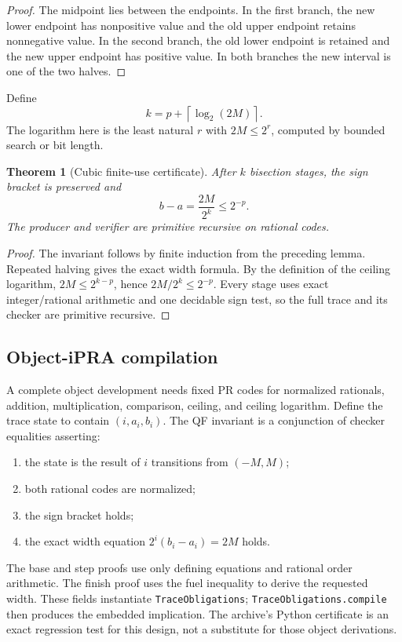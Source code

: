 \documentclass[11pt]{article}
\newtheorem{theorem}{Theorem}[section]
\begin{document}
\begin{proof}
The midpoint lies between the endpoints.  In the first branch, the new lower
endpoint has nonpositive value and the old upper endpoint retains nonnegative
value.  In the second branch, the old lower endpoint is retained and the new
upper endpoint has positive value.  In both branches the new interval is one
of the two halves.
\end{proof}

Define
\[
  k=p+\left\lceil\log_2(2M)\right\rceil.
\]
The logarithm here is the least natural \(r\) with \(2M\le2^r\), computed by
bounded search or bit length.

\begin{theorem}[Cubic finite-use certificate]
\label{thm:cubic}
After \(k\) bisection stages, the sign bracket is preserved and
\[
  b-a=\frac{2M}{2^k}\le2^{-p}.
\]
The producer and verifier are primitive recursive on rational codes.
\end{theorem}

\begin{proof}
The invariant follows by finite induction from the preceding lemma.  Repeated
halving gives the exact width formula.  By the definition of the ceiling
logarithm, \(2M\le2^{k-p}\), hence \(2M/2^k\le2^{-p}\).  Every stage uses exact
integer/rational arithmetic and one decidable sign test, so the full trace and
its checker are primitive recursive.
\end{proof}

\subsection{Object-iPRA compilation}

A complete object development needs fixed PR codes for normalized rationals,
addition, multiplication, comparison, ceiling, and ceiling logarithm.  Define
the trace state to contain \((i,a_i,b_i)\).  The QF invariant is a conjunction
of checker equalities asserting:

\begin{enumerate}
\item the state is the result of \(i\) transitions from \((-M,M)\);
\item both rational codes are normalized;
\item the sign bracket holds;
\item the exact width equation \(2^i(b_i-a_i)=2M\) holds.
\end{enumerate}

The base and step proofs use only defining equations and rational order
arithmetic.  The finish proof uses the fuel inequality to derive the requested
width.  These fields instantiate \texttt{TraceObligations};
\texttt{TraceObligations.compile} then produces the embedded implication.  The
archive's Python certificate is an exact regression test for this design, not
a substitute for those object derivations.
\end{document}
